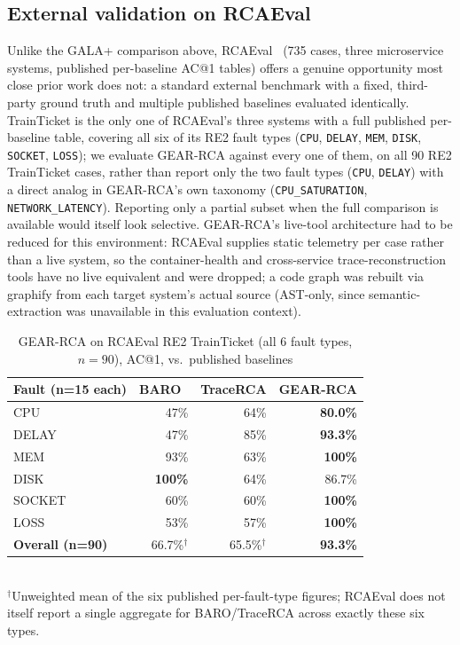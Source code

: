 \documentclass[conference]{IEEEtran}
\begin{document}
\subsection{External validation on RCAEval}
\label{sec:rcaeval-validation}

Unlike the GALA+ comparison above, RCAEval~\cite{rcaeval} (735 cases, three microservice systems, published
per-baseline AC@1 tables) offers a genuine opportunity most close prior work does not: a standard external
benchmark with a fixed, third-party ground truth and multiple published baselines evaluated identically.
TrainTicket is the only one of RCAEval's three systems with a full published per-baseline table, covering all
six of its RE2 fault types (\texttt{CPU}, \texttt{DELAY}, \texttt{MEM}, \texttt{DISK}, \texttt{SOCKET},
\texttt{LOSS}); we evaluate GEAR-RCA against every one of them, on all 90 RE2 TrainTicket cases, rather than
report only the two fault types (\texttt{CPU}, \texttt{DELAY}) with a direct analog in GEAR-RCA's own taxonomy
(\texttt{CPU\_SATURATION}, \texttt{NETWORK\_LATENCY}). Reporting only a partial subset when the full comparison
is available would itself look selective. GEAR-RCA's live-tool architecture had to be reduced for this environment:
RCAEval supplies static telemetry per case rather than a live system, so the container-health and cross-service
trace-reconstruction tools have no live equivalent and were dropped; a code graph was rebuilt via graphify from
each target system's actual source (AST-only, since semantic-extraction was unavailable in this evaluation
context).

\begin{table}[t]
\caption{GEAR-RCA on RCAEval RE2 TrainTicket (all 6 fault types, $n=90$), AC@1, vs.\ published baselines}
\label{tab:rcaeval}
\centering
\begin{tabular}{@{}lrrr@{}}
\toprule
\textbf{Fault (n=15 each)} & \textbf{BARO~\cite{baro}} & \textbf{TraceRCA} & \textbf{GEAR-RCA} \\
\midrule
CPU & 47\% & 64\% & \textbf{80.0\%} \\
DELAY & 47\% & 85\% & \textbf{93.3\%} \\
MEM & 93\% & 63\% & \textbf{100\%} \\
DISK & \textbf{100\%} & 64\% & 86.7\% \\
SOCKET & 60\% & 60\% & \textbf{100\%} \\
LOSS & 53\% & 57\% & \textbf{100\%} \\
\midrule
\textbf{Overall (n=90)} & 66.7\%$^\dagger$ & 65.5\%$^\dagger$ & \textbf{93.3\%} \\
\bottomrule
\end{tabular}
\\[2pt]
{\scriptsize $^\dagger$Unweighted mean of the six published per-fault-type figures; RCAEval does not itself
report a single aggregate for BARO/TraceRCA across exactly these six types.}
\end{table}
\end{document}
